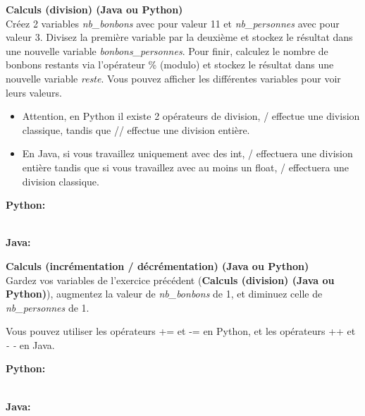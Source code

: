  \begin{Exercice}[10 minutes] \textbf{Calculs (division) (Java ou Python)}\\
     Créez 2 variables \textit{nb\_bonbons} avec pour valeur 11 et \textit{nb\_personnes} avec pour valeur 3. Divisez la première variable par la deuxième et stockez le résultat dans une nouvelle variable \textit{bonbons\_personnes}. Pour finir, calculez le nombre de bonbons restants via l'opérateur \% (modulo) et stockez le résultat dans une nouvelle variable \textit{reste}. Vous pouvez afficher les différentes variables pour voir leurs valeurs. \\
     
      \begin{conseil}
         \begin{itemize}
            \item Attention, en Python il existe 2 opérateurs de division, / effectue une division classique, tandis que // effectue une division entière.
            \item En Java, si vous travaillez uniquement avec des int, / effectuera une division entière tandis que si vous travaillez avec au moins un float, / effectuera une division classique.
         \end{itemize}
      \end{conseil}
      \begin{solution}
      
      \textbf{Python:}
      
      
      
      \textbf{\\Java:}
      
             
      \end{solution}   
  \end{Exercice}
  
 \begin{Exercice}[5 minutes] \textbf{Calculs (incrémentation / décrémentation) (Java ou Python)}\\
    Gardez vos variables de l'exercice précédent (\textbf{Calculs (division) (Java ou Python)}), augmentez la valeur de \textit{nb\_bonbons} de 1, et diminuez celle de \textit{nb\_personnes} de 1.  \\
    
     \begin{conseil}
           Vous pouvez utiliser les opérateurs += et -= en Python, et les opérateurs ++ et \textit{- -} en Java.
         
     \end{conseil}
     \begin{solution}
     
     \textbf{Python:}
     
     
     \textbf{\\Java:}
     
            
     \end{solution}   
 \end{Exercice}

